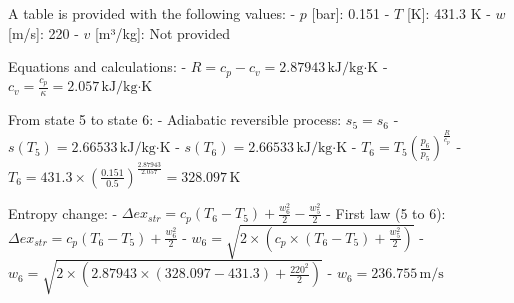 A table is provided with the following values:  
- \( p \) [bar]: 0.151  
- \( T \) [K]: 431.3 K  
- \( w \) [m/s]: 220  
- \( v \) [m³/kg]: Not provided  

Equations and calculations:  
- \( R = c_p - c_v = 2.87943 \, \text{kJ/kg·K} \)  
- \( c_v = \frac{c_p}{\kappa} = 2.057 \, \text{kJ/kg·K} \)  

From state 5 to state 6:  
- Adiabatic reversible process: \( s_5 = s_6 \)  
- \( s(T_5) = 2.66533 \, \text{kJ/kg·K} \)  
- \( s(T_6) = 2.66533 \, \text{kJ/kg·K} \)  
- \( T_6 = T_5 \left( \frac{p_6}{p_5} \right)^{\frac{R}{c_p}} \)  
- \( T_6 = 431.3 \times \left( \frac{0.151}{0.5} \right)^{\frac{2.87943}{2.057}} = 328.097 \, \text{K} \)  

Entropy change:  
- \( \Delta ex_{str} = c_p (T_6 - T_5) + \frac{w_6^2}{2} - \frac{w_5^2}{2} \)  
- First law (5 to 6):  
  \( \Delta ex_{str} = c_p (T_6 - T_5) + \frac{w_6^2}{2} \)  
- \( w_6 = \sqrt{2 \times (c_p \times (T_6 - T_5) + \frac{w_5^2}{2})} \)  
- \( w_6 = \sqrt{2 \times (2.87943 \times (328.097 - 431.3) + \frac{220^2}{2})} \)  
- \( w_6 = 236.755 \, \text{m/s} \)